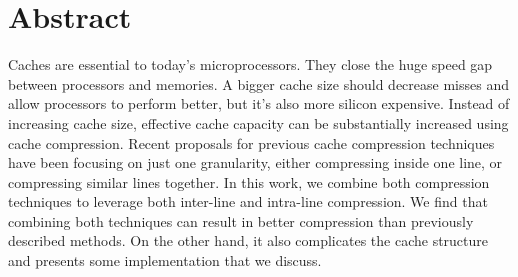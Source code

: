 
\chapter{Abstract}
Caches are essential to today's microprocessors. They close the huge speed gap between processors and memories. A bigger cache size should decrease misses and allow processors to perform better, but it's also more silicon expensive. Instead of increasing cache size, effective cache capacity can be substantially increased using cache compression. Recent proposals for previous cache compression techniques have been focusing on just one granularity, either compressing inside one line, or compressing similar lines together. In this work, we combine both compression techniques to leverage both inter-line and intra-line compression. We find that combining both techniques can result in better compression than previously described methods. On the other hand, it also complicates the cache structure and presents some implementation that we discuss.

